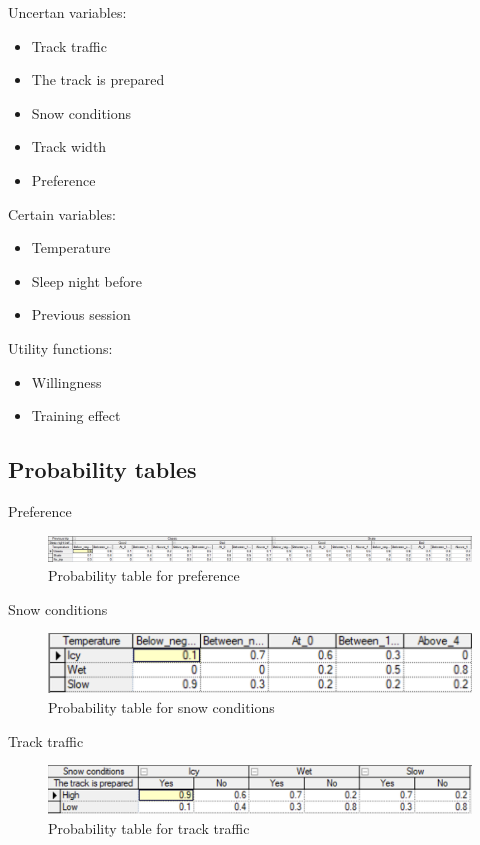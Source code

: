 \documentclass{article}
\begin{document}
Uncertan variables:
\begin{itemize}
    \item Track traffic
    \item The track is prepared
    \item Snow conditions
    \item Track width
    \item Preference
\end{itemize}

Certain variables:
\begin{itemize}
    \item Temperature
    \item Sleep night before
    \item Previous session
\end{itemize}

Utility functions:
\begin{itemize}
    \item Willingness
    \item Training effect
\end{itemize}

\subsection*{Probability tables}

Preference

\begin{figure}[h]
    \centering
    \includegraphics[width=\linewidth]{preference.png}
    \caption{Probability table for preference}
    \label{fig:image2}
\end{figure}

Snow conditions

\begin{figure}[h]
    \centering
    \includegraphics[width=\linewidth]{snow_conditions.png}
    \caption{Probability table for snow conditions}
    \label{fig:image3}
\end{figure}

Track traffic

\begin{figure}[h]
    \centering
    \includegraphics[width=\linewidth]{track_traffic.png}
    \caption{Probability table for track traffic}
    \label{fig:image4}
\end{figure}
\end{document}
